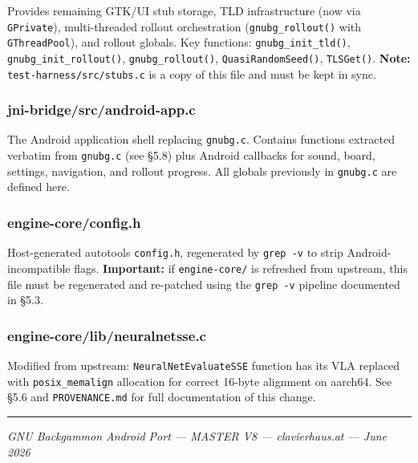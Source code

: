 \documentclass[11pt,a4paper]{article}
\begin{document}
Provides remaining GTK/UI stub storage, TLD infrastructure (now via
\texttt{GPrivate}), multi-threaded rollout orchestration
(\texttt{gnubg\_rollout()} with \texttt{GThreadPool}), and rollout
globals. Key functions: \texttt{gnubg\_init\_tld()},
\texttt{gnubg\_init\_rollout()}, \texttt{gnubg\_rollout()},
\texttt{QuasiRandomSeed()}, \texttt{TLSGet()}. \textbf{Note:}
\texttt{test-harness/src/stubs.c} is a copy of this file and must be
kept in sync.

\subsubsection{jni-bridge/src/android-app.c}\label{jni-bridgesrcandroid-app.c}

The Android application shell replacing \texttt{gnubg.c}. Contains
functions extracted verbatim from \texttt{gnubg.c} (see §5.8) plus
Android callbacks for sound, board, settings, navigation, and rollout
progress. All globals previously in \texttt{gnubg.c} are defined here.

\subsubsection{engine-core/config.h}\label{engine-coreconfig.h}

Host-generated autotools \texttt{config.h}, regenerated by
\texttt{grep\ -v} to strip Android-incompatible flags.
\textbf{Important:} if \texttt{engine-core/} is refreshed from upstream,
this file must be regenerated and re-patched using the \texttt{grep\ -v}
pipeline documented in §5.3.

\subsubsection{engine-core/lib/neuralnetsse.c}\label{engine-corelibneuralnetsse.c}

Modified from upstream: \texttt{NeuralNetEvaluateSSE} function has its
VLA replaced with \texttt{posix\_memalign} allocation for correct
16-byte alignment on aarch64. See §5.6 and \texttt{PROVENANCE.md} for
full documentation of this change.

\begin{center}\rule{0.5\linewidth}{0.5pt}\end{center}

\emph{GNU Backgammon Android Port --- MASTER V8 --- clavierhaus.at ---
June 2026}
\end{document}

